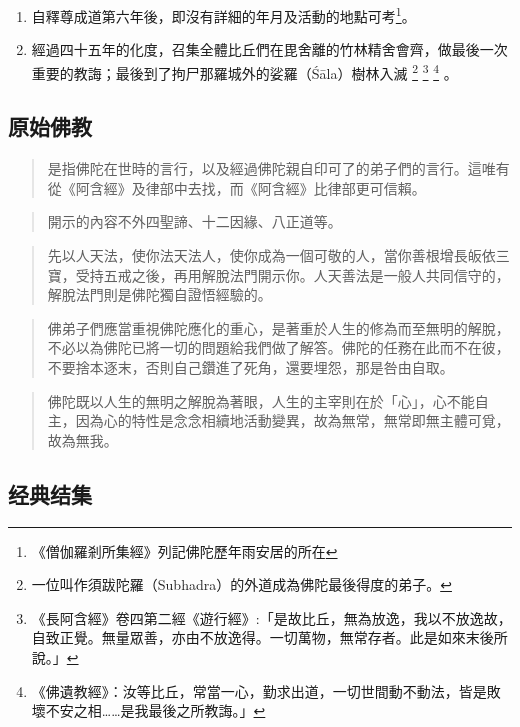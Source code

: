 \begin{enumerate}
    \footnote{後世傳稱的佛陀的十大弟子，除了須菩提（Subhūti）似乎出家較遲而外，到此為止，其他的九位，均已出現了。}
    。
  \item 自釋尊成道第六年後，即沒有詳細的年月及活動的地點可考\footnote{《僧伽羅剎所集經》列記佛陀歷年雨安居的所在}。
  \item 經過四十五年的化度，召集全體比丘們在毘舍離的竹林精舍會齊，做最後一次重要的教誨；最後到了拘尸那羅城外的娑羅（Śāla）樹林入滅
    \footnote{一位叫作須跋陀羅（Subhadra）的外道成為佛陀最後得度的弟子。}
    \footnote{《長阿含經》卷四第二經《遊行經》:「是故比丘，無為放逸，我以不放逸故，自致正覺。無量眾善，亦由不放逸得。一切萬物，無常存者。此是如來末後所說。」}
    \footnote{《佛遺教經》：汝等比丘，常當一心，勤求出道，一切世間動不動法，皆是敗壞不安之相……是我最後之所教誨。」}
    。
\end{enumerate}


\subsection{原始佛教}
\begin{quote}
  是指佛陀在世時的言行，以及經過佛陀親自印可了的弟子們的言行。這唯有從《阿含經》及律部中去找，而《阿含經》比律部更可信賴。
\end{quote}
\begin{quote}
  開示的內容不外四聖諦、十二因緣、八正道等。
\end{quote}
\begin{quote}
  先以人天法，使你法天法人，使你成為一個可敬的人，當你善根增長皈依三寶，受持五戒之後，再用解脫法門開示你。人天善法是一般人共同信守的，解脫法門則是佛陀獨自證悟經驗的。
\end{quote}
\begin{quote}
  佛弟子們應當重視佛陀應化的重心，是著重於人生的修為而至無明的解脫，不必以為佛陀已將一切的問題給我們做了解答。佛陀的任務在此而不在彼，不要捨本逐末，否則自己鑽進了死角，還要埋怨，那是咎由自取。
\end{quote}
\begin{quote}
  佛陀既以人生的無明之解脫為著眼，人生的主宰則在於「心」，心不能自主，因為心的特性是念念相續地活動變異，故為無常，無常即無主體可覓，故為無我。
\end{quote}

\subsection{经典结集}
